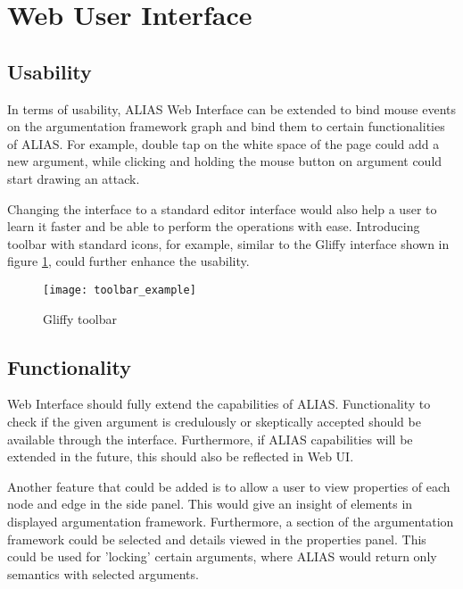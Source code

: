 \section{Web User Interface}

\subsection{Usability}
In terms of usability, ALIAS Web Interface can be extended to bind mouse events on the argumentation framework graph and bind them to certain functionalities of ALIAS. For example, double tap on the white space of the page could add a new argument, while clicking and holding the mouse button on argument could start drawing an attack. 

Changing the interface to a standard editor interface would also help a user to learn it faster and be able to perform the operations with ease. Introducing toolbar with standard icons, for example, similar to the Gliffy interface shown in figure \ref{fig:toolbarExample}, could further enhance the usability.

\begin{figure}
	\texttt{[image: toolbar\_example]}
	\caption{Gliffy toolbar}
	\label{fig:toolbarExample}
\end{figure}

\subsection{Functionality}
Web Interface should fully extend the capabilities of ALIAS. Functionality to check if the given argument is credulously or skeptically accepted should be available through the interface. Furthermore, if ALIAS capabilities will be extended in the future, this should also be reflected in Web UI.

Another feature that could be added is to allow a user to view properties of each node and edge in the side panel. This would give an insight of elements in displayed argumentation framework. Furthermore, a section of the argumentation framework could be selected and details viewed in the properties panel. This could be used for 'locking' certain arguments, where ALIAS would return only semantics with selected arguments.

